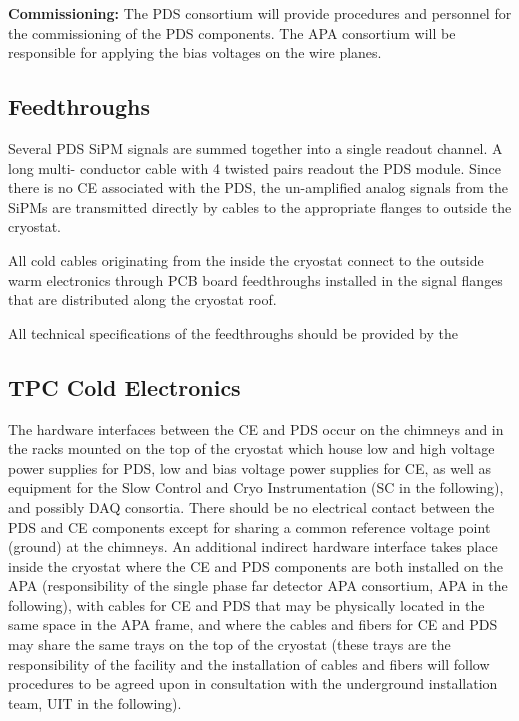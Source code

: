 \textbf{Commissioning: }
The PDS consortium will provide procedures and personnel for the commissioning of the PDS components.
The APA consortium will be responsible for applying the bias voltages on the wire planes. 



\subsection{Feedthroughs}
\label{sec:fdsp-pd-intfc-feed}

Several PDS SiPM signals are summed together into a single readout channel. A long multi- conductor cable with 4 twisted pairs readout the PDS module. Since there is no CE associated with the PDS, the un-amplified analog signals from the SiPMs are transmitted directly by cables to the appropriate flanges to outside the cryostat. 

All cold cables originating from the inside the cryostat connect to the outside warm electronics through PCB board feedthroughs installed in the signal flanges that are distributed along the cryostat roof.

All technical specifications of the feedthroughs should be provided by the 

\subsection{TPC Cold Electronics}
\label{sec:fdsp-pd-intfc-ce}

The hardware interfaces between the CE and PDS occur on the chimneys and in the racks mounted on the top of the cryostat which house low and high voltage power supplies for PDS, low and bias voltage power supplies for CE, as well as equipment for the Slow Control and Cryo Instrumentation (SC in the following), and possibly DAQ consortia. There should be no electrical contact between the PDS and CE components except for sharing a common reference voltage point (ground) at the chimneys. An additional indirect hardware interface takes place inside the cryostat where the CE and PDS components are both installed on the APA (responsibility of the single phase far detector APA consortium, APA in the following), with cables for CE and PDS that may be physically located in the same space in the APA frame, and where the cables and fibers for CE and PDS may share the same trays on the top of the cryostat (these trays are the responsibility of the facility and the installation of cables and fibers will follow procedures to be agreed upon in consultation with the underground installation team, UIT in the following).

